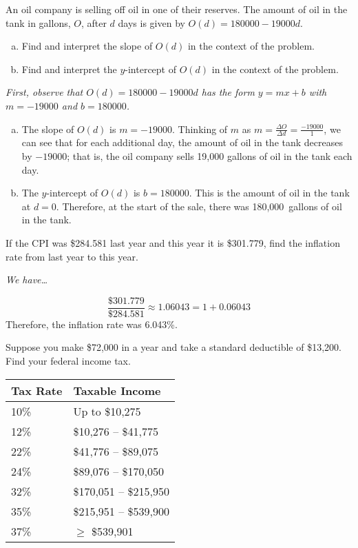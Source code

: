 \documentclass[12pt,letterpaper]{exam}
\begin{document}
\begin{questions}
\newpage
\question[10] An oil company is selling off oil in one of their reserves. The amount of oil in the tank in gallons, $O$, after $d$ days is given by $O(d)= 180000 - 19000d$.
	\begin{enumerate}[(a)]
	\item Find and interpret the slope of $O(d)$ in the context of the problem. 
	\item Find and interpret the $y$-intercept of $O(d)$ in the context of the problem. 
	\end{enumerate} \pspace

{\itshape First, observe that $O(d)= 180000 - 19000d$ has the form $y= mx + b$ with $m= -19000$ and $b= 180000$. 
\begin{enumerate}[(a)]
\item The slope of $O(d)$ is $m= -19000$. Thinking of $m$ as $m= \frac{\Delta O}{\Delta d}= \frac{-19000}{1}$, we can see that for each additional day, the amount of oil in the tank decreases by $-19000$; that is, the oil company sells 19,000 gallons of oil in the tank each day. \pspace

\item The $y$-intercept of $O(d)$ is $b= 180000$. This is the amount of oil in the tank at $d= 0$. Therefore, at the start of the sale, there was 180,000~gallons of oil in the tank. 
\end{enumerate}
}



\newpage
\question[10] If the CPI was \$284.581 last year and this year it is \$301.779, find the inflation rate from last year to this year. \pspace

{\itshape
\sol We have\dots \par\vspace{0.1cm}
	\[
	\dfrac{\$301.779}{\$284.581} \approx 1.06043= 1 + 0.06043
	\] \pspace
Therefore, the inflation rate was 6.043\%. 
}



\newpage
\question[10] Suppose you make \$72,000 in a year and take a standard deductible of \$13,200. Find your federal income tax. \par
	\begin{table}[!ht]
	\centering
	\begin{tabular}{|l|l|} \hline
	Tax Rate & Taxable Income \\ \hline \hline
	10\% & Up to \$10,275 \\ \hline
	12\% & \$10,276 -- \$41,775 \\ \hline
	22\% & \$41,776 -- \$89,075 \\ \hline
	24\% & \$89,076 -- \$170,050 \\ \hline
	32\% & \$170,051 -- \$215,950 \\ \hline
	35\% & \$215,951 -- \$539,900 \\ \hline
	37\% & $\geq$ \$539,901 \\ \hline
	\end{tabular}
	\end{table} \pspace


\end{questions}
\end{document}
